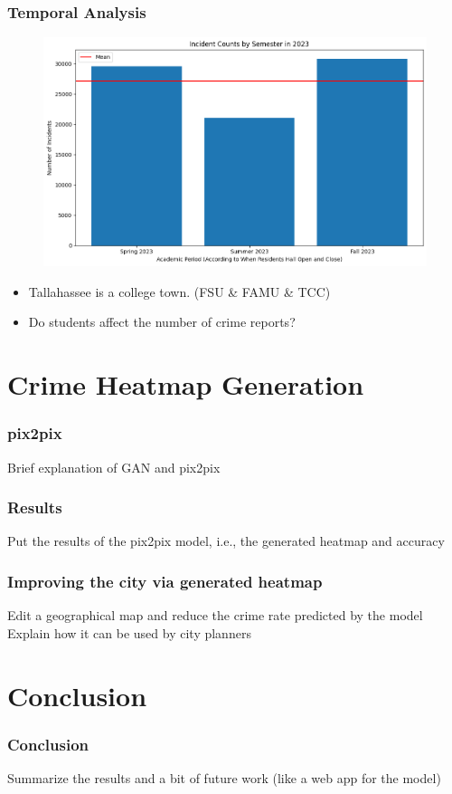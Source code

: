 \documentclass{beamer}
\begin{document}

\begin{frame}
    \frametitle{Temporal Analysis}
        \begin{figure}
            \flushleft
            \includegraphics[width=1\linewidth]{Figures/Incident Counts by Semester in 2023.png}
        \end{figure}
        {\scriptsize %
        \begin{itemize}
            \item Tallahassee is a college town. (FSU \& FAMU \& TCC)
            \item Do students affect the number of crime reports?
        \end{itemize}
        }
\end{frame}





\section{Crime Heatmap Generation}

\begin{frame}
    \frametitle{pix2pix}
    Brief explanation of GAN and pix2pix
\end{frame}

\begin{frame}
    \frametitle{Results}
    Put the results of the pix2pix model, i.e., the generated heatmap and accuracy
\end{frame}

\begin{frame}
    \frametitle{Improving the city via generated heatmap}
    Edit a geographical map and reduce the crime rate predicted by the model
    Explain how it can be used by city planners
\end{frame}

\section{Conclusion}
\begin{frame}
    \frametitle{Conclusion}
    Summarize the results and a bit of future work (like a web app for the model)
\end{frame}
\end{document}
